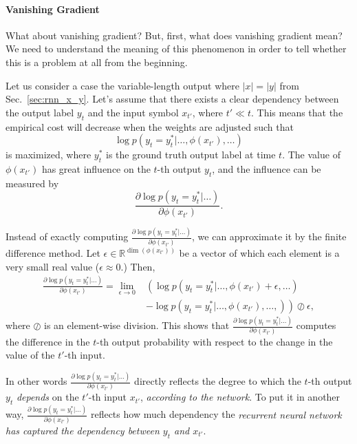 \documentclass{report}
\newcommand{\RR}[0]{\mathbb{R}}
\begin{document}
\paragraph{Vanishing Gradient}

What about vanishing gradient? But, first, what does vanishing gradient mean? We
need to understand the meaning of this phenomenon in order to tell whether this
is a problem at all from the beginning.

Let us consider a case the variable-length output where $|x|=|y|$ from
Sec.~\ref{sec:rnn_x_y}. Let's assume that there exists a clear dependency
between the output label $y_t$ and the input symbol $x_{t'}$, where $t' \ll t$.
This means that the empirical cost will decrease when the weights are adjusted
such that 
\[
    \log p(y_t=y_t^*| \ldots, \phi(x_{t'}), \ldots)
\]
is maximized, where $y_t^*$ is the ground truth output label at time $t$. The
value of $\phi(x_{t'})$ has great influence on the $t$-th output $y_t$, and the
influence can be measured by 
\[ 
    \frac{\partial \log p(y_t=y_t^*| \ldots)}{\partial \phi(x_{t'})}.
\]

Instead of exactly computing $\frac{\partial \log p(y_t=y_t^*| \ldots)}{\partial
\phi(x_{t'})}$, we can approximate it by the finite difference method. Let
$\epsilon \in \RR^{\dim(\phi(x_{t'}))}$ be a vector of which each element is a
very small real value ($\epsilon \approx 0$.) Then,
\begin{align*}
    \frac{\partial \log p(y_t=y_t^*|\ldots)}{\partial \phi(x_{t'})} 
    = \lim_{\epsilon \to 0}& \left(\log p(y_t=y_t^*|\ldots,
    \phi(x_{t'})+\epsilon, \ldots)
    \right.
    \\
&- \left. \log p(y_t=y_t^*|\ldots, \phi(x_{t'}), \ldots, )\right) \oslash \epsilon,
\end{align*}
where $\oslash$ is an element-wise division.  This shows that $\frac{\partial
\log p(y_t=y_t^*|\ldots)}{\partial \phi(x_{t'})}$ computes the difference in the
$t$-th output probability with respect to the change in the value of the $t'$-th
input. 

In other words $\frac{\partial \log p(y_t=y_t^*|\ldots)}{\partial \phi(x_{t'})}$
directly reflects the degree to which the $t$-th output $y_t$ {\em depends} on
the $t'$-th input $x_{t'}$, {\em according to the network}.  To put it in
another way, $\frac{\partial \log p(y_t=y_t^*|\ldots)}{\partial\phi(x_{t'})}$
reflects how much dependency the {\em recurrent neural network has captured the
dependency between $y_t$ and $x_{t'}$}.
\end{document}
